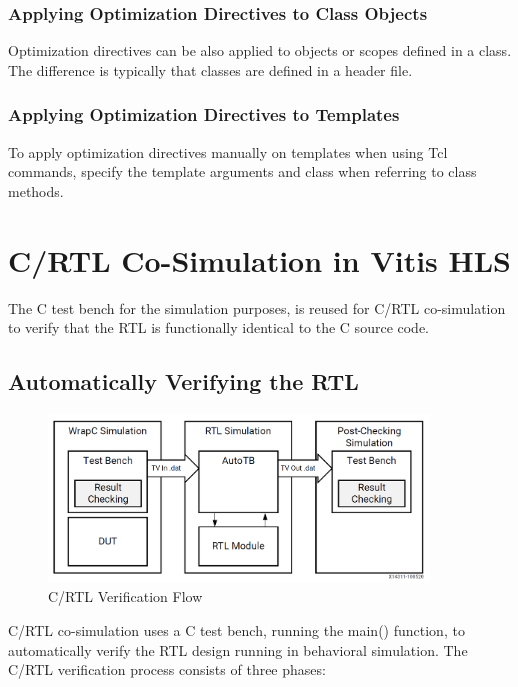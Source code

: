 \subsubsection{Applying Optimization Directives to Class Objects}
Optimization directives can be also applied to objects or scopes defined in a class. The difference is typically that classes are defined in a header file. 

\subsubsection{Applying Optimization Directives to Templates}
To apply optimization directives manually on templates when using Tcl commands, specify the template arguments and class when referring to class methods. 


\clearpage
\section{C/RTL Co-Simulation in Vitis HLS}
The C test bench for the simulation purposes, is reused for C/RTL co-simulation to verify that the RTL is functionally identical to the C source code. 

\subsection{Automatically Verifying the RTL}
\begin{figure}[H]
  \begin{center}
      \includegraphics[width=0.9\textwidth]{images/CRTLVerification.PNG}
      \caption{C/RTL Verification Flow}
      \label{CRTLVerification.PNG}
  \end{center}
\end{figure}

C/RTL co-simulation uses a C test bench, running the main() function, to automatically verify the RTL design running in behavioral simulation. The C/RTL verification process consists of three phases:

